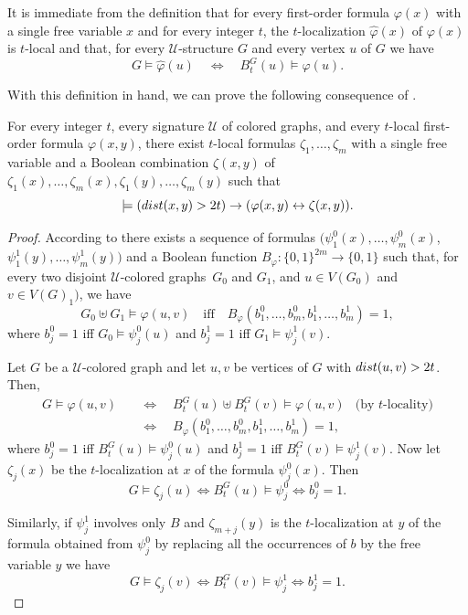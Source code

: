 \documentclass{lmcs}
\renewcommand{\phi}{\varphi}
\theoremstyle{definition}
\DeclareMathOperator{\union}{\uplus}
\begin{document}
\begin{exa}
It is immediate from the definition that for every first-order formula $\phi(x)$ with a single free variable $x$ and for every integer $t$, the $t$-localization $\widehat{\phi}(x)$ of $\phi(x)$ is $t$-local and that, for every $\mathcal U$-structure $G$ and every vertex $u$ of $G$ we have
\[
G\models\widehat\phi(u)\quad\iff\quad B_t^G(u)\models\phi(u).
\]

With this definition in hand, we can prove the following consequence of .

\begin{cor}
\label{cor:loc_dec}
	For every integer $t$, every signature $\mathcal U$ of colored graphs,  and every $t$-local first-order formula $\phi(x,y)$, there
	exist $t$-local formulas $\zeta_1,\dots,\zeta_m$ with a single free variable and a Boolean combination $\zeta(x,y)$ of  $\zeta_1(x),\dots,\zeta_m(x),\zeta_1(y),\dots,\zeta_m(y)$ such that
	\[
	\models ({\rm dist}(x,y)>2t)\rightarrow (\phi(x,y)\leftrightarrow\zeta(x,y)).
	\]
\end{cor}

\begin{proof}
	According to  there exists a sequence of formulas
	$(\psi_1^0(x),\dots,\psi_m^0(x)$, $\psi_1^1(y),\dots,\psi_m^1(y))$ and a Boolean function $B_\phi:\{0,1\}^{2m}\rightarrow\{0,1\}$ such that, for every two disjoint $\mathcal U$-colored graphs~$G_0$ and $G_1$, and $u\in V(G_0)$ and $v\in V(G)_1)$, we have
	\[
	G_0 \union G_1\models \phi(u,v)\quad
	\text{iff}\quad
	B_\phi(b_1^0,\dots,b_m^0,b_1^1,\dots,b_m^1)=1,
	\]
	where $b_j^0=1$ iff $G_0\models \psi_j^0(u)$ and 
	$b_j^1=1$ iff $G_1\models\psi_j^1(v)$.
	
	Let $G$ be a $\mathcal U$-colored graph and let $u,v$ be vertices of $G$ with ${\rm dist}(u,v)>2t$.
	Then,
	\begin{align*}
		G\models \phi(u,v)\quad&\iff\quad B_t^{G}(u)\union B_t^{G}(v)\models \phi(u,v)&\text{(by  $t$-locality)}\\
		&\iff\quad
			B_\phi(b_1^0,\dots,b_m^0,b_1^1,\dots,b_m^1)=1,&
	\end{align*}
	where $b_j^0=1$ iff $B_t^{G}(u)\models \psi_j^0(u)$ and 
	$b_j^1=1$ iff $B_t^{G}(v)\models\psi_j^1(v)$.
	Now let $\zeta_j(x)$ be the $t$-localization at $x$ of the formula $\psi_j^0(x)$. Then 
	\[
	G\models\zeta_j(u)\iff B_t^G(u)\models\psi_j^0\iff b_j^0=1.
	\]

	Similarly,  if $\psi_j^1$ involves only $B$ and $\zeta_{m+j}(y)$ is the $t$-localization at $y$ of the formula obtained from $\psi_j^0$ by replacing all the occurrences of $b$ by the free variable $y$ we have
	\[
	G\models\zeta_j(v)\iff B_t^G(v)\models\psi_j^1\iff b_j^1=1.
	\]


\end{proof}
\end{exa}
\end{document}
